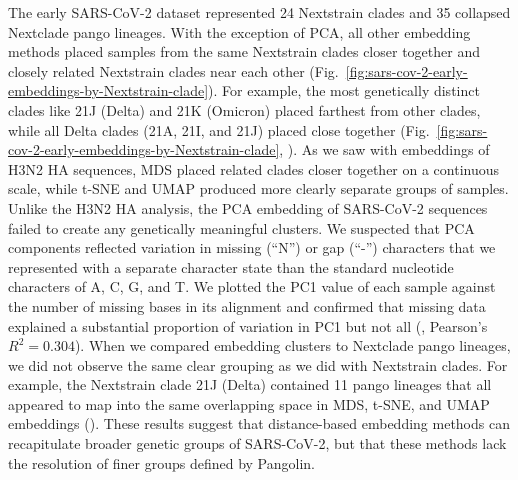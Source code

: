 \documentclass[10pt,letterpaper]{article}
\begin{document}
The early SARS-CoV-2 dataset represented 24 Nextstrain clades and 35 collapsed Nextclade pango lineages.
With the exception of PCA, all other embedding methods placed samples from the same Nextstrain clades closer together and closely related Nextstrain clades near each other (Fig.~\ref{fig:sars-cov-2-early-embeddings-by-Nextstrain-clade}).
For example, the most genetically distinct clades like 21J (Delta) and 21K (Omicron) placed farthest from other clades, while all Delta clades (21A, 21I, and 21J) placed close together (Fig.~\ref{fig:sars-cov-2-early-embeddings-by-Nextstrain-clade}, ).
As we saw with embeddings of H3N2 HA sequences, MDS placed related clades closer together on a continuous scale, while t-SNE and UMAP produced more clearly separate groups of samples.
Unlike the H3N2 HA analysis, the PCA embedding of SARS-CoV-2 sequences failed to create any genetically meaningful clusters.
We suspected that PCA components reflected variation in missing (``N'') or gap (``-'') characters that we represented with a separate character state than the standard nucleotide characters of A, C, G, and T.
We plotted the PC1 value of each sample against the number of missing bases in its alignment and confirmed that missing data explained a substantial proportion of variation in PC1 but not all (, Pearson's $R^{2}=0.304$).
When we compared embedding clusters to Nextclade pango lineages, we did not observe the same clear grouping as we did with Nextstrain clades.
For example, the Nextstrain clade 21J (Delta) contained 11 pango lineages that all appeared to map into the same overlapping space in MDS, t-SNE, and UMAP embeddings ().
These results suggest that distance-based embedding methods can recapitulate broader genetic groups of SARS-CoV-2, but that these methods lack the resolution of finer groups defined by Pangolin.
\end{document}
